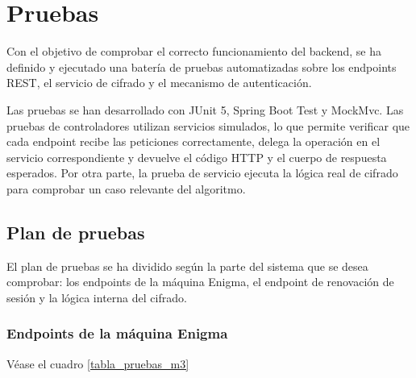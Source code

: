 \chapter{Pruebas}

Con el objetivo de comprobar el correcto funcionamiento del backend, se ha definido y ejecutado una batería de pruebas automatizadas sobre los endpoints REST, el servicio de cifrado y el mecanismo de autenticación.

Las pruebas se han desarrollado con JUnit 5, Spring Boot Test y MockMvc. Las pruebas de controladores utilizan servicios simulados, lo que permite verificar que cada endpoint recibe las peticiones correctamente, delega la operación en el servicio correspondiente y devuelve el código HTTP y el cuerpo de respuesta esperados. Por otra parte, la prueba de servicio ejecuta la lógica real de cifrado para comprobar un caso relevante del algoritmo.

\section{Plan de pruebas}

El plan de pruebas se ha dividido según la parte del sistema que se desea comprobar: los endpoints de la máquina Enigma, el endpoint de renovación de sesión y la lógica interna del cifrado.

\subsection{Endpoints de la máquina Enigma}

Véase el cuadro \ref{tabla_pruebas_m3}

